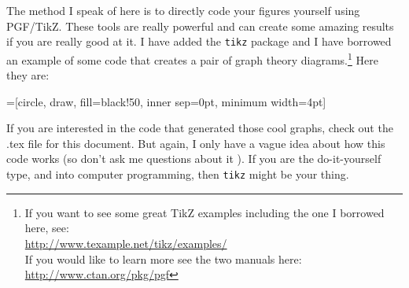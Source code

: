 \documentclass{article}
\newcommand{\nid}{\noindent} %
\begin{document}
The method I speak of here is to directly code your figures yourself using PGF/TikZ.  These tools are really powerful and can create some amazing results if you are really good at it.  I have added the \texttt{tikz} package and I have borrowed an example of some code that creates a pair of graph theory diagrams.\footnote{If you want to see some great TikZ examples including the one I borrowed here, see:\\ \url{http://www.texample.net/tikz/examples/}\\
If you would like to learn more see the two manuals here:\\ \url{http://www.ctan.org/pkg/pgf}} Here they are:\\

{=[circle, draw, fill=black!50,
                        inner sep=0pt, minimum width=4pt]
\quad
{}
}

\vspace{10pt}
\nid If you are interested in the code that generated those cool graphs, check out the .tex file for this document.  But again, I only have a vague idea about how this code works (so don't ask me questions about it \smiley).  If you are the do-it-yourself type, and into computer programming, then \texttt{tikz} might be your thing.
\end{document}
